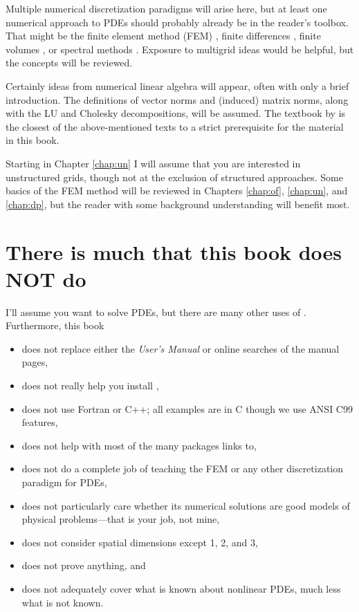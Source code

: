 Multiple numerical discretization paradigms will arise here, but at least one numerical approach to PDEs should probably already be in the reader's toolbox.  That might be the finite element method (FEM) \citep{Braess2007,Elmanetal2005}, finite differences \citep{MortonMayers2005}, finite volumes \citep{LeVeque2002}, or spectral methods \citep{KarniadakisSherwin2013,Trefethen2000}.  Exposure to multigrid ideas \citep{Briggsetal2000} would be helpful, but the concepts will be reviewed.

Certainly ideas from numerical linear algebra \citep{Greenbaum1997,TrefethenBau1997} will appear, often with only a brief introduction.  The definitions of vector norms and (induced) matrix norms, along with the LU and Cholesky decompositions, will be assumed.  The textbook by \citet{TrefethenBau1997} is the closest of the above-mentioned texts to a strict prerequisite for the material in this book.

Starting in Chapter \ref{chap:un} I will assume that you are interested in unstructured grids, though not at the exclusion of structured approaches.  Some basics of the FEM method will be reviewed in Chapters \ref{chap:of}, \ref{chap:un}, and \ref{chap:dp}, but the reader with some background understanding will benefit most.


\section{There is much that this book does NOT do}

I'll assume you want to solve PDEs, but there are many other uses of \PETSc.  Furthermore, this book\begin{itemize}
\item  does not replace either the \PETSc \emph{User's Manual} or online searches of the \PETSc manual pages,
\item  does not really help you install \PETSc,
\item  does not use Fortran or C++; all examples are in C though we use ANSI C99 features,
\item  does not help with most of the many packages \PETSc links to,
\item  does not do a complete job of teaching the FEM or any other discretization paradigm for PDEs,
\item  does not particularly care whether its numerical solutions are good models of physical problems---that is your job, not mine,
\item  does not consider spatial dimensions except 1, 2, and 3,
\item  does not prove anything, and
\item  does not adequately cover what is known about nonlinear PDEs, much less what is not known.
\end{itemize}


